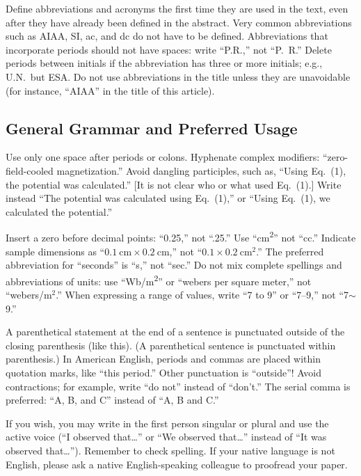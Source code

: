 \documentclass[conf]{new-aiaa}
\begin{document}
Define abbreviations and acronyms the first time they are used in the text, even after they have already been defined in the abstract. Very common abbreviations such as AIAA, SI, ac, and dc do not have to be defined. Abbreviations that incorporate periods should not have spaces: write ``P.R.,'' not ``P.~R.'' Delete periods between initials if the abbreviation has three or more initials; e.g., U.N.~but ESA. Do not use abbreviations in the title unless they are unavoidable (for instance, ``AIAA'' in the title of this article).

\subsection{General Grammar and Preferred Usage}
Use only one space after periods or colons. Hyphenate complex modifiers: ``zero-field-cooled magnetization.'' Avoid dangling participles, such as, ``Using Eq.~(1), the potential was calculated.'' [It is not clear who or what used Eq.~(1).] Write instead ``The potential was calculated using Eq.~(1),'' or ``Using Eq.~(1), we calculated the potential.''

Insert a zero before decimal points: ``0.25,'' not ``.25.'' Use ``\si{\centi\meter\squared}'' not ``cc.'' Indicate sample dimensions as ``$\SI{0.1}{\centi\meter} \times \SI{0.2}{\centi\meter}$,'' not ``$0.1 \times \SI{0.2}{\centi\meter\squared}$.'' The preferred abbreviation for ``seconds'' is ``s,'' not ``sec.'' Do not mix complete spellings and abbreviations of units: use ``\si[per-mode=symbol]{\weber\per\meter\squared}'' or ``webers per square meter,'' not ``webers/m$^2$.'' When expressing a range of values, write ``7 to 9'' or ``7--9,'' not ``7$\sim$9.''

A parenthetical statement at the end of a sentence is punctuated outside of the closing parenthesis (like this). (A parenthetical sentence is punctuated within parenthesis.) In American English, periods and commas are placed within quotation marks, like ``this period.'' Other punctuation is ``outside''! Avoid contractions; for example, write ``do not'' instead of ``don’t.'' The serial comma is preferred: ``A, B, and C'' instead of ``A, B and C.''

If you wish, you may write in the first person singular or plural and use the active voice (``I observed that\ldots'' or ``We observed that\ldots'' instead of ``It was observed that\ldots''). Remember to check spelling. If your native language is not English, please ask a native English-speaking colleague to proofread your paper.
\end{document}
